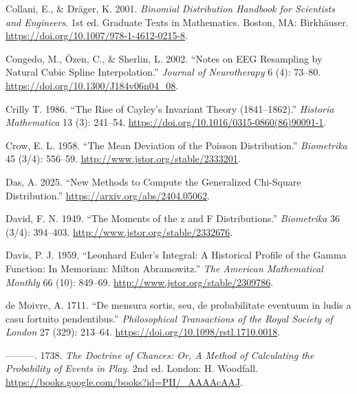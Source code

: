 \documentclass[
]{article}
\newlength{\cslhangindent}
\newlength{\cslentryspacingunit} %
\newenvironment{CSLReferences}[2] %
 {%
  \setlength{\parindent}{0pt}
  \ifodd #1
  \let\oldpar\par
  \def\par{\hangindent=\cslhangindent\oldpar}
  \fi
  \setlength{\parskip}{#2\cslentryspacingunit}
 }%
 {}
\begin{document}
\begin{CSLReferences}{1}{0}
\leavevmode{}%
Collani, E., \& Dräger, K. 2001. \emph{Binomial Distribution Handbook
for Scientists and Engineers}. 1st ed. Graduate Texts in Mathematics.
Boston, MA: Birkhäuser. \url{https://doi.org/10.1007/978-1-4612-0215-8}.

\leavevmode{}%
Congedo, M., Özen, C., \& Sherlin, L. 2002. {``Notes on EEG Resampling
by Natural Cubic Spline Interpolation.''} \emph{Journal of Neurotherapy}
6 (4): 73--80. \url{https://doi.org/10.1300/J184v06n04_08}.

\leavevmode{}%
Crilly T. 1986. {``The Rise of Cayley's Invariant Theory
(1841--1862).''} \emph{Historia Mathematica} 13 (3): 241--54.
\url{https://doi.org/10.1016/0315-0860(86)90091-1}.

\leavevmode{}%
Crow, E. L. 1958. {``The Mean Deviation of the Poisson Distribution.''}
\emph{Biometrika} 45 (3/4): 556--59.
\url{http://www.jstor.org/stable/2333201}.

\leavevmode{}%
Das, A. 2025. {``New Methods to Compute the Generalized Chi-Square
Distribution.''} \url{https://arxiv.org/abs/2404.05062}.

\leavevmode{}%
David, F. N. 1949. {``{The Moments of the z and F Distributions}.''}
\emph{Biometrika} 36 (3/4): 394--403.
\url{http://www.jstor.org/stable/2332676}.

\leavevmode{}%
Davis, P. J. 1959. {``Leonhard Euler's Integral: A Historical Profile of
the Gamma Function: In Memoriam: Milton Abramowitz.''} \emph{The
American Mathematical Monthly} 66 (10): 849--69.
\url{http://www.jstor.org/stable/2309786}.

\leavevmode{}%
de Moivre, A. 1711. {``{De mensura sortis, seu, de probabilitate
eventuum in ludis a casu fortuito pendentibus}.''} \emph{Philosophical
Transactions of the Royal Society of London} 27 (329): 213--64.
\url{https://doi.org/10.1098/rstl.1710.0018}.

\leavevmode{}%
---------. 1738. \emph{{The Doctrine of Chances: Or, A Method of
Calculating the Probability of Events in Play}}. 2nd ed. London: H.
Woodfall. \url{https://books.google.com/books?id=PII/_AAAAcAAJ}.


\end{CSLReferences}
\end{document}
